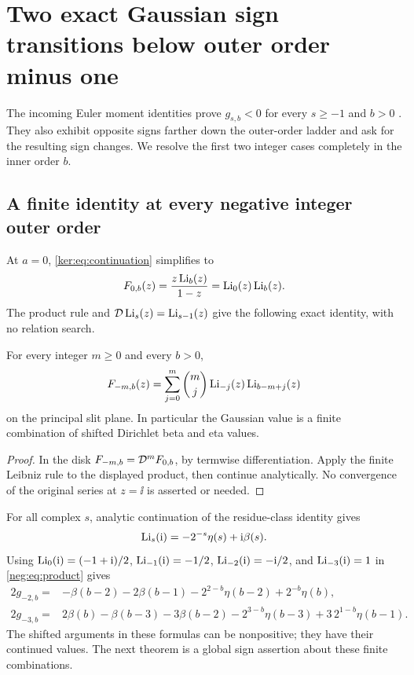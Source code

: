 \section{Two exact Gaussian sign transitions below outer order minus one}
\label{sec:negative}
The incoming Euler moment identities prove $g_{s,b}<0$ for every
$s\ge-1$ and $b>0$ \cite[Section 6]{IncomingSharp}. They also exhibit
opposite signs farther down the outer-order ladder and ask for the
resulting sign changes. We resolve the first two integer cases
completely in the inner order $b$.

\subsection{A finite identity at every negative integer outer order}
At $a=0$, \eqref{ker:eq:continuation} simplifies to
\[
 F_{0,b}(z)=\frac{z\operatorname{Li}_b(z)}{1-z}=\operatorname{Li}_0(z)\operatorname{Li}_b(z).
\]
The product rule and $\mathcal D\operatorname{Li}_s(z)=\operatorname{Li}_{s-1}(z)$ give the following
exact identity, with no relation search.

\begin{proposition}\label{neg:prop:product}
For every integer $m\ge0$ and every $b>0$,
\begin{equation}\label{neg:eq:product}
 F_{-m,b}(z)=\sum_{j=0}^m\binom mj
                  \operatorname{Li}_{-j}(z)\operatorname{Li}_{b-m+j}(z)
\end{equation}
on the principal slit plane. In particular the Gaussian value is a
finite combination of shifted Dirichlet beta and eta values.
\end{proposition}
\begin{proof}
In the disk $F_{-m,b}=\mathcal D^mF_{0,b}$, by termwise differentiation.
Apply the finite Leibniz rule to the displayed product, then continue
analytically. No convergence of the original series at $z=\ii$ is
asserted or needed.
\end{proof}

For all complex $s$, analytic continuation of the residue-class identity
gives
\begin{equation}\label{neg:eq:Li-beta}
 \operatorname{Li}_s(\mathrm i)=-2^{-s}\eta(s)+\mathrm i\beta(s).
\end{equation}
Using
$\operatorname{Li}_0(\mathrm i)=(-1+\mathrm i)/2$,
$\operatorname{Li}_{-1}(\mathrm i)=-1/2$,
$\operatorname{Li}_{-2}(\mathrm i)=-\mathrm i/2$,
and $\operatorname{Li}_{-3}(\mathrm i)=1$ in \eqref{neg:eq:product} gives
\begin{align}
 2g_{-2,b}={}&-\beta(b-2)-2\beta(b-1)
              -2^{2-b}\eta(b-2)+2^{-b}\eta(b),\label{neg:eq:m2}\\
 2g_{-3,b}={}&2\beta(b)-\beta(b-3)-3\beta(b-2)
              -2^{3-b}\eta(b-3)
              +3\,2^{1-b}\eta(b-1).\label{neg:eq:m3}
\end{align}
The shifted arguments in these formulas can be nonpositive; they have
their continued values. The next theorem is a global sign assertion
about these finite combinations.

